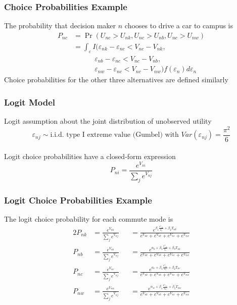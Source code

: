 \documentclass{beamer}\usepackage[]{graphicx}\usepackage[]{color}
\begin{document}
\begin{frame}\frametitle{Choice Probabilities Example}
    The probability that decision maker $n$ chooses to drive a car to campus is
    \begin{align*}
    	P_{nc} &= \Pr(U_{nc} > U_{nk}, U_{nc} > U_{nb}, U_{nc} > U_{nw}) \\
    	&= \int_{\varepsilon} I(\varepsilon_{nk} - \varepsilon_{nc} < V_{nc} - V_{nk}, \\
    	& \qquad \quad \varepsilon_{nb} - \varepsilon_{nc} < V_{nc} - V_{nb}, \\
    	& \qquad \quad \varepsilon_{nw} - \varepsilon_{nc} < V_{nc} - V_{nw}) f(\varepsilon_n) d\varepsilon_n
    \end{align*}
    Choice probabilities for the other three alternatives are defined similarly
\end{frame}

\begin{frame}\frametitle{Logit Model}
    Logit assumption about the joint distribution of unobserved utility
	$$\varepsilon_{nj} \sim \text{i.i.d.\ type I extreme value (Gumbel) with } Var(\varepsilon_{nj}) = \frac{\pi^2}{6}$$ \\
	\vspace{2ex}
	Logit choice probabilities have a closed-form expression
	$$P_{ni} = \frac{e^{V_{ni}}}{\sum_j e^{V_{nj}}}$$
\end{frame}

\begin{frame}\frametitle{Logit Choice Probabilities Example}
    The logit choice probability for each commute mode is
    \begin{alignat*}{2}
    	P_{nk} &= \frac{e^{V_{nk}}}{\sum_j e^{V_{nj}}} &&= \frac{e^{\beta_1 \frac{C_{nk}}{I_n} + \beta_2 T_{nk}}}{e^{V_{nk}} + e^{V_{nb}} + e^{V_{nc}} + e^{V_{nw}}} \\
    	P_{nb} &= \frac{e^{V_{nb}}}{\sum_j e^{V_{nj}}} &&= \frac{e^{\alpha_b + \beta_1 \frac{C_{nb}}{I_n} + \beta_3 T_{nb}}}{e^{V_{nk}} + e^{V_{nb}} + e^{V_{nc}} + e^{V_{nw}}} \\
    	P_{nc} &= \frac{e^{V_{nc}}}{\sum_j e^{V_{nj}}} &&= \frac{e^{\alpha_c + \beta_1 \frac{C_{nc}}{I_n} + \beta_4 T_{nc}}}{e^{V_{nk}} + e^{V_{nb}} + e^{V_{nc}} + e^{V_{nw}}} \\
    	P_{nw} &= \frac{e^{V_{nw}}}{\sum_j e^{V_{nj}}} &&= \frac{e^{\alpha_w + \beta_1 \frac{C_{nw}}{I_n} + \beta_5 T_{nw}}}{e^{V_{nk}} + e^{V_{nb}} + e^{V_{nc}} + e^{V_{nw}}}
    \end{alignat*}
\end{frame}
\end{document}
